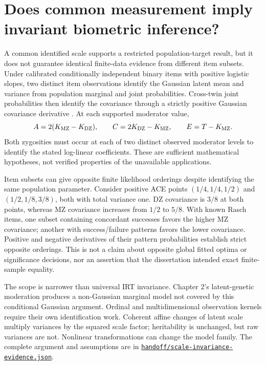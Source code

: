 \documentclass[11pt]{article}
\begin{document}
\section{Does common measurement imply invariant biometric inference?}
A common identified scale supports a restricted population-target result, but it does not guarantee identical finite-data evidence from different item subsets. Under calibrated conditionally independent binary items with positive logistic slopes, two distinct item observations identify the Gaussian latent mean and variance from population marginal and joint probabilities. Cross-twin joint probabilities then identify the covariance through a strictly positive Gaussian covariance derivative \citep{voigtlaender2020}. At each supported moderator value,
\[
 A=2(K_{\rm MZ}-K_{\rm DZ}),\qquad C=2K_{\rm DZ}-K_{\rm MZ},\qquad E=T-K_{\rm MZ}.
\]
Both zygosities must occur at each of two distinct observed moderator levels to identify the stated log-linear coefficients. These are sufficient mathematical hypotheses, not verified properties of the unavailable applications.

Item subsets can give opposite finite likelihood orderings despite identifying the same population parameter. Consider positive ACE points $(1/4,1/4,1/2)$ and $(1/2,1/8,3/8)$, both with total variance one. DZ covariance is $3/8$ at both points, whereas MZ covariance increases from $1/2$ to $5/8$. With known Rasch items, one subset containing concordant successes favors the higher MZ covariance; another with success/failure patterns favors the lower covariance. Positive and negative derivatives of their pattern probabilities establish strict opposite orderings. This is not a claim about opposite global fitted optima or significance decisions, nor an assertion that the dissertation intended exact finite-sample equality.

The scope is narrower than universal IRT invariance. Chapter 2's latent-genetic moderation produces a non-Gaussian marginal model not covered by this conditional Gaussian argument. Ordinal and multidimensional observation kernels require their own identification work. Coherent affine changes of latent scale multiply variances by the squared scale factor; heritability is unchanged, but raw variances are not. Nonlinear transformations can change the model family. The complete argument and assumptions are in \href{https://github.com/alectionary/vibe-math/blob/master/formalization/schwabe-psychometric-genetics/handoff/scale-invariance-evidence.json}{\nolinkurl{handoff/scale-invariance-evidence.json}}.
\end{document}
